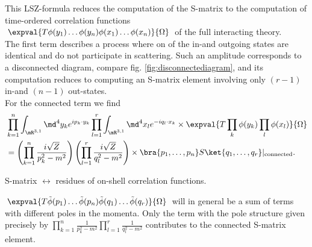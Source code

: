 This LSZ-formula reduces the computation of the S-matrix to the computation of time-ordered correlation functions\\ $\expval{T\phi(y_1) \dots \phi(y_n) \phi(x_1)\dots \phi(x_n)}{\Omega}$ of the full interacting theory.\\
The first term describes a process where on of the in-and outgoing states are identical and do not participate in scattering.
Such an amplitude corresponds to a disconnected diagram, compare fig. \ref{fig:disconnectediagram}, and its computation reduces to computing an S-matrix element involving only $(r-1)$ in-and $(n-1)$ out-states.\\
For the connected term we find
\begin{align*}
	&\prod_{k=1}^{n} \int_{\mR^{3,1}} \md^4y_k e^{i p_k \cdot y_k} \prod_{l=1}^{r} \int_{\mR^{3,1}} \md^4x_l e^{-i q_l \cdot x_k}  \times \expval{T\prod_k \phi(y_k) \prod_l \phi(x_l)}{\Omega}\\
	&= \left(\prod_{k=1}^n \frac{i \sqrt{Z}}{p^2_k-m^2}\right) \left(\prod_{l=1}^{r} \frac{i \sqrt{Z}}{q^2_l - m^2}\right) \times \bra{p_1,\dots,p_n}S\ket{q_1,\dots,q_r}  |_{\mathrm{connected}}.
\end{align*}
\begin{statements}
	S-matrix $\leftrightarrow$ residues of on-shell correlation functions.
\end{statements}
$\expval{T\tilde{\phi}(p_1) \dots \tilde{\phi}(p_n) \tilde{\phi}(q_1)\dots \tilde{\phi}(q_r)}{\Omega} $ will in general be a sum of terms with different poles in the momenta. Only the term with the pole structure given precisely by $\prod_{k=1}^{n} \frac{1}{p^2_k - m^2} \prod_{l=1}^{r} \frac{1}{q^2_l-m^2}$ contributes to the connected S-matrix element.



